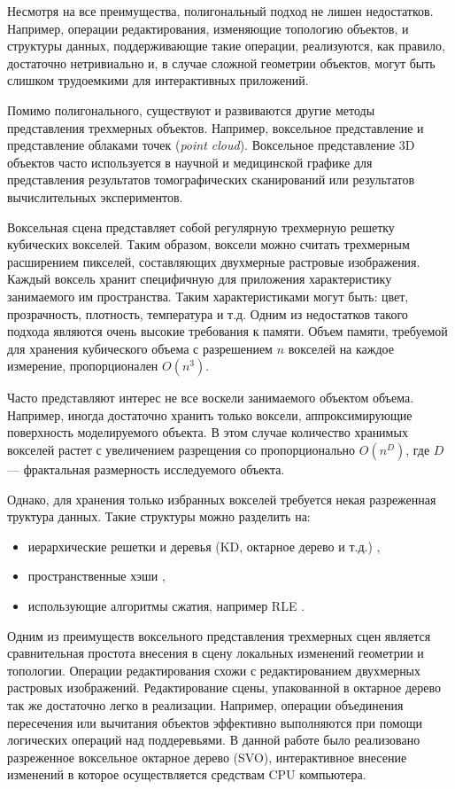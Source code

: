 Несмотря на все преимущества, полигональный подход не лишен недостатков. Например, операции редактирования, изменяющие топологию объектов, и структуры данных, поддерживающие такие операции, реализуются, как правило, достаточно нетривиально и, в случае сложной геометрии объектов, могут быть слишком трудоемкими для интерактивных приложений.

Помимо полигонального, существуют и развиваются другие методы представления трехмерных объектов. Например, воксельное представление и представление облаками точек \cite{point_cloud} (\emph{point cloud}). Воксельное представление 3D объектов часто используется в научной и медицинской графике для представления результатов томографических сканирований или результатов вычислительных экспериментов.

Воксельная сцена представляет собой регулярную трехмерную решетку кубических вокселей. Таким образом, воксели можно считать трехмерным расширением пикселей, составляющих двухмерные растровые изображения. Каждый воксель хранит специфичную для приложения характеристику занимаемого им пространства. Таким характеристиками могут быть: цвет, прозрачность, плотность, температура и т.д. Одним из недостатков такого подхода являются очень высокие требования к памяти. Объем памяти, требуемой для хранения кубического объема с разрешением $n$ вокселей на каждое измерение, пропорционален $O(n^3)$.

Часто представляют интерес не все воскели занимаемого объектом объема. Например, иногда достаточно хранить только воксели, аппроксимирующие поверхность моделируемого объекта. В этом случае количество хранимых вокселей растет с увеличением разрещения со пропорционально $O(n^D)$, где $D$ --- фрактальная размерность\cite{mandel} исследуемого объекта.

Однако, для хранения только избранных вокселей требуется некая разреженная труктура данных. Такие структуры можно разделить на:
\begin{itemize}
\item иерархические решетки и деревья (KD, октарное дерево и т.д.) \cite{gpu_octree},
\item пространственные хэши \cite{gpu_hash},
\item использующие алгоритмы сжатия, например RLE \cite{voxel_rle}.
\end{itemize}

Одним из преимуществ воксельного представления трехмерных сцен является сравнительная простота внесения в сцену локальных изменений геометрии и топологии. Операции редактирования схожи с редактированием двухмерных растровых изображений. Редактирование сцены, упакованной в октарное дерево так же достаточно легко в реализации. Например, операции объединения пересечения или вычитания объектов эффективно выполняются при помощи логических операций над поддеревьями. В данной работе было реализовано разреженное воксельное октарное дерево (SVO)\cite{svo_olick}, интерактивное внесение изменений в которое осуществляется средствам CPU компьютера.


